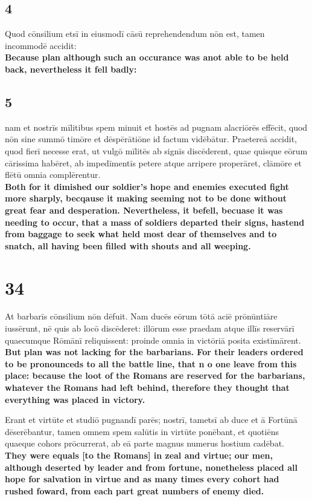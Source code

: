 \documentclass{article}
\begin{document}
\subsection*{4}
Quod cōnsilium etsī in eiusmodī cāsū reprehendendum nōn est, tamen incommodē accidit:\\
\textbf{Because plan although such an occurance was anot able to be held back, nevertheless it fell badly:}


\subsection*{5}
nam et nostrīs mīlitibus spem minuit et hostēs ad pugnam alacriōrēs effēcit, quod nōn sine summō timōre et dēspērātiōne id factum vidēbātur. Praetereā accidit, quod fierī necesse erat, ut vulgō mīlitēs ab signīs discēderent, quae quisque eōrum cārissima habēret, ab impedīmentīs petere atque arripere properāret, clāmōre et flētū omnia complērentur.\\
\textbf{Both for it dimished our soldier's hope and enemies executed fight more sharply, becqause it making seeming not to be done without great fear and desperation. Nevertheless, it befell, becuase it was needing to occur, that a mass of soldiers departed their signs, hastend from baggage to seek what held most dear of themselves and to snatch, all having been filled with shouts and all weeping.}

\section*{34}
At barbarīs cōnsilium nōn dēfuit. Nam ducēs eōrum tōtā aciē prōnūntiāre iussērunt, nē quis ab locō discēderet: illōrum esse praedam atque illīs reservārī quaecumque Rōmānī reliquissent: proinde omnia in victōriā posita existīmārent.  \\ 
\textbf{But plan was not lacking for the barbarians. For their leaders ordered to be pronounceds to all the battle line, that n o one leave from this place: because the loot of the Romans are reserved for the barbarians, whatever the Romans had left behind, therefore they thought that everything was placed in victory.}

Erant et virtūte et studiō pugnandī parēs; nostrī, tametsī ab duce et ā Fortūnā dēserēbantur, tamen omnem spem salūtis in virtūte ponēbant, et quotiēns quaeque cohors prōcurrerat, ab eā parte magnus numerus hostium cadēbat.  \\ 
\textbf{They were equals [to the Romans] in zeal and virtue; our men, although deserted by leader and from fortune, nonetheless placed all hope for salvation in virtue and as many times every cohort had rushed foward, from each part great numbers of enemy died.}
\end{document}
